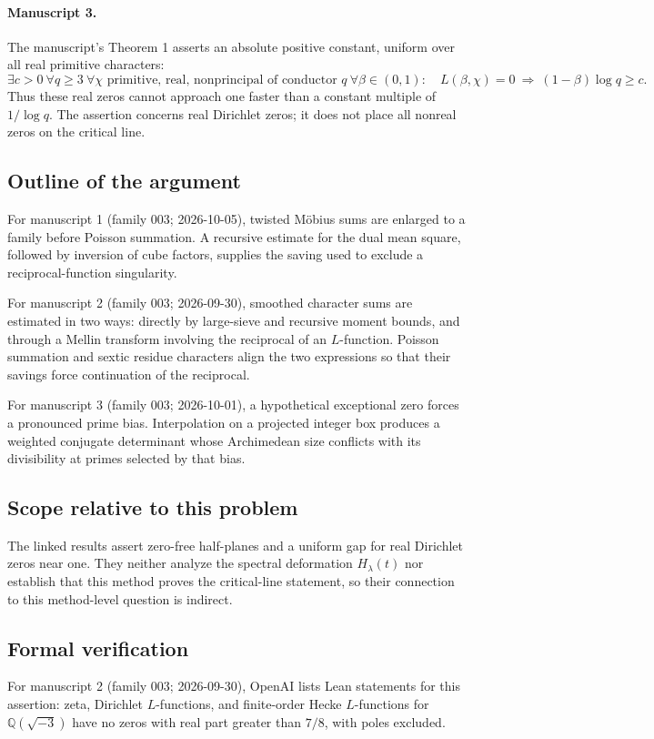 \documentclass[11pt]{article}
\begin{document}
\paragraph{Manuscript 3.}
The manuscript's Theorem 1 asserts an absolute positive constant, uniform over all real primitive characters:
\[
 \exists c>0\ \forall q\ge3\ \forall\chi\text{ primitive, real, nonprincipal of conductor }q
 \ \forall\beta\in(0,1):\quad L(\beta,\chi)=0
 \ \Longrightarrow\ (1-\beta)\log q\ge c.
\]
Thus these real zeros cannot approach one faster than a constant multiple of $1/\log q$. The assertion concerns real Dirichlet zeros; it does not place all nonreal zeros on the critical line.

\subsection{Outline of the argument}
For manuscript 1 (family 003; 2026-10-05), twisted M\"obius sums are enlarged to a family before Poisson summation. A recursive estimate for the dual mean square, followed by inversion of cube factors, supplies the saving used to exclude a reciprocal-function singularity.

For manuscript 2 (family 003; 2026-09-30), smoothed character sums are estimated in two ways: directly by large-sieve and recursive moment bounds, and through a Mellin transform involving the reciprocal of an $L$-function. Poisson summation and sextic residue characters align the two expressions so that their savings force continuation of the reciprocal.

For manuscript 3 (family 003; 2026-10-01), a hypothetical exceptional zero forces a pronounced prime bias. Interpolation on a projected integer box produces a weighted conjugate determinant whose Archimedean size conflicts with its divisibility at primes selected by that bias.

\subsection{Scope relative to this problem}
The linked results assert zero-free half-planes and a uniform gap for real Dirichlet zeros near one. They neither analyze the spectral deformation $H_\lambda(t)$ nor establish that this method proves the critical-line statement, so their connection to this method-level question is indirect.

\subsection{Formal verification}
For manuscript 2 (family 003; 2026-09-30), OpenAI lists Lean statements for this assertion: zeta, Dirichlet $L$-functions, and finite-order Hecke $L$-functions for $\mathbb Q(\sqrt{-3})$ have no zeros with real part greater than $7/8$, with poles excluded.
\end{document}
